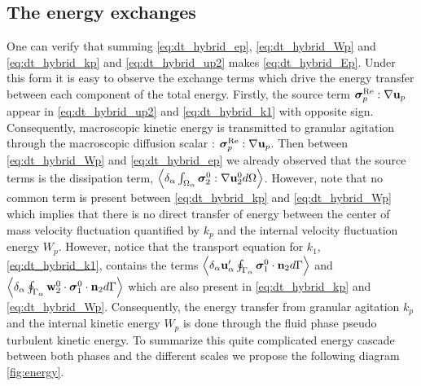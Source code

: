 \subsection{The energy exchanges}

One can verify that summing \ref{eq:dt_hybrid_ep}, \ref{eq:dt_hybrid_Wp} and \ref{eq:dt_hybrid_kp} and \ref{eq:dt_hybrid_up2} makes \ref{eq:dt_hybrid_Ep}.  
Under this form it is easy to observe the exchange terms which drive the energy transfer between each component of the total energy. 
Firstly, the source term $\bm{\sigma}_p^\text{Re} :\mathbf{\nabla} \textbf{u}_p$ appear in \ref{eq:dt_hybrid_up2} and \ref{eq:dt_hybrid_k1} with opposite sign. 
Consequently, macroscopic kinetic energy is transmitted to granular agitation through the macroscopic diffusion scalar : $\bm{\sigma}_p^\text{Re} :\mathbf{\nabla} \textbf{u}_p$. 
Then between \ref{eq:dt_hybrid_Wp} and \ref{eq:dt_hybrid_ep} we already observed that the source terms is the dissipation term,  $\left<\delta_\alpha \int_{\Omega_\alpha} \bm{\sigma}_2^0:\mathbf{\nabla} \textbf{u}_2^0 d\Omega\right>$.
However, note that no common term is present between \ref{eq:dt_hybrid_kp} and \ref{eq:dt_hybrid_Wp} which implies that there is no direct transfer of energy between the center of mass velocity fluctuation quantified by $k_p$ and the internal velocity fluctuation energy $W_p$. 
However, notice that the transport equation for $k_1$, \ref{eq:dt_hybrid_k1}, contains the terms $\left<\delta_\alpha \textbf{u}_\alpha' \oint_{\Gamma_\alpha} \bm{\sigma}_1^0 \cdot \textbf{n}_2 d\Gamma\right>$ and $\left<\delta_\alpha \oint_{\Gamma_\alpha} \textbf{w}_2^0 \cdot \bm{\sigma}_1^0 \cdot \textbf{n}_2 d\Gamma\right>$ which are also present in \ref{eq:dt_hybrid_kp} and \ref{eq:dt_hybrid_Wp}. 
Consequently, the energy transfer from granular agitation $k_p$ and the internal kinetic energy $W_p$ is done through the fluid phase pseudo turbulent kinetic energy. 
To summarize this quite complicated energy cascade between both phases and the different scales we propose the following diagram \ref{fig:energy}. 
